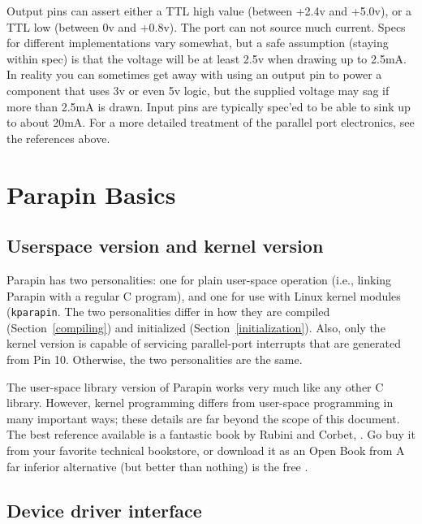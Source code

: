 \documentclass{article}
\begin{document}
Output pins can assert either a TTL high value (between +2.4v and
+5.0v), or a TTL low (between 0v and +0.8v).  The port can not source
much current.  Specs for different implementations vary somewhat, but
a safe assumption (staying within spec) is that the voltage will be at
least 2.5v when drawing up to 2.5mA.  In reality you can sometimes get
away with using an output pin to power a component that uses 3v or
even 5v logic, but the supplied voltage may sag if more than 2.5mA is
drawn.  Input pins are typically spec'ed to be able to sink up to
about 20mA.  For a more detailed treatment of the parallel port
electronics, see the references above.

\section{Parapin Basics}
\label{basics}
\subsection{Userspace version and kernel version}

Parapin has two personalities: one for plain user-space operation
(i.e., linking Parapin with a regular C program), and one for use with
Linux kernel modules ({\tt kparapin}.
The two personalities differ in how they are
compiled (Section~\ref{compiling}) and initialized
(Section~\ref{initialization}).  Also, only the kernel version is
capable of servicing parallel-port interrupts that are generated from
Pin 10.  Otherwise, the two personalities are the same.

The user-space library version of Parapin works very much like any
other C library.  However, kernel programming differs from user-space
programming in many important ways; these details are far beyond the
scope of this document.  The best reference available is
a fantastic book by Rubini and Corbet, .  Go buy it
from your favorite technical bookstore, or download it as an Open Book
from 
A far inferior alternative (but better than nothing) is the free
.

\subsection{Device driver interface}
\end{document}
